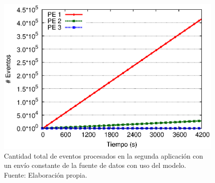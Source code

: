 \begin{figure}[!ht]
	\centering
	\captionsetup{justification=centering}
    \includegraphics[scale=0.7]{images/exp/app2/uniform/sm/eventCount.eps}
    \caption[Cantidad total de eventos procesados en la segunda aplicación con un envío constante de la fuente de datos con uso del modelo.]{Cantidad total de eventos procesados en la segunda aplicación con un envío constante de la fuente de datos con uso del modelo.\\Fuente: Elaboración propia.}
    \label{fig:app2-uniform-eventCount-sm}
\end{figure}


